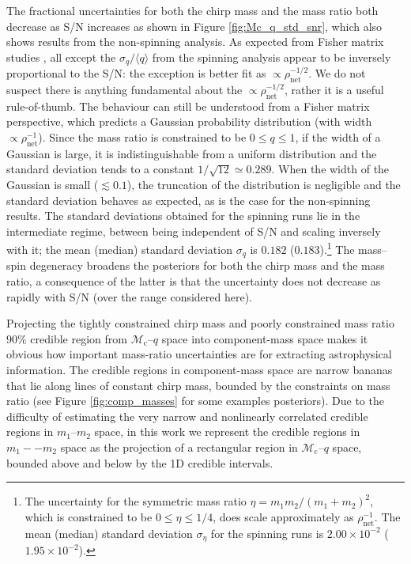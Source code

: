 The fractional uncertainties for both the chirp mass and the mass ratio both decrease as S/N increases as shown in Figure \ref{fig:Mc_q_std_snr}, which also shows results from the non-spinning analysis. As expected from Fisher matrix studies \citep[e.g.,]{FinnChernoff}, all except the $\sigma_q/\langle q\rangle$ from the spinning analysis appear to be inversely proportional to the S/N: the exception is better fit as $\propto \rho_\mathrm{net}^{-1/2}$. We do not suspect there is anything fundamental about the $\propto \rho_\mathrm{net}^{-1/2}$, rather it is a useful rule-of-thumb. The behaviour can still be understood from a Fisher matrix perspective, which predicts a Gaussian probability distribution (with width $\propto \rho_\mathrm{net}^{-1}$). Since the mass ratio is constrained to be $0 \leq q \leq 1$, if the width of a Gaussian is large, it is indistinguishable from a uniform distribution and the standard deviation tends to a constant $1/\sqrt{12} \simeq 0.289$. When the width of the Gaussian is small ($\lesssim 0.1$), the truncation of the distribution is negligible and the standard deviation behaves as expected, as is the case for the non-spinning results. The standard deviations obtained for the spinning runs lie in the intermediate regime, between being independent of S/N and scaling inversely with it; the mean (median) standard deviation $\sigma_q$ is $0.182$ ($0.183$).\footnote{The uncertainty  for the symmetric mass ratio $\eta = m_1m_2/(m_1 + m_2)^2$, which is constrained to be $0 \leq \eta \leq 1/4$, does scale approximately as $\rho_\mathrm{net}^{-1}$. The mean (median) standard deviation $\sigma_\eta$ for the spinning runs is $2.00\times 10^{-2}$ ($1.95\times 10^{-2}$).} The mass--spin degeneracy broadens the posteriors for both the chirp mass and the mass ratio, a consequence of the latter is that the uncertainty does not decrease as rapidly with S/N (over the range considered here). 
  
Projecting the tightly constrained chirp mass and poorly constrained mass ratio $90\%$ credible region from $\mathcal{M}_\mathrm{c}$--$q$ space into component-mass space makes it obvious how important mass-ratio uncertainties are for extracting astrophysical information.  The credible regions in component-mass space are narrow bananas that lie along lines of constant chirp mass, bounded by the constraints on mass ratio (see Figure \ref{fig:comp_masses} for some examples posteriors).  Due to the difficulty of estimating the very narrow and nonlinearly correlated credible regions in $m_1$--$m_2$ space, in this work we represent the credible regions in $m_1--m_2$ space as the projection of a rectangular region in $\mathcal{M}_\mathrm{c}$--$q$ space, bounded above and below by the 1D credible intervals.
  
  
  
  
  
  